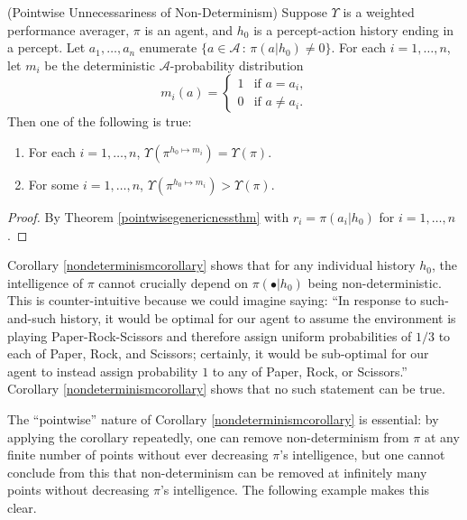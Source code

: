 \documentclass[runningheads]{llncs}
\begin{document}
\begin{corollary}
\label{nondeterminismcorollary}
    (Pointwise Unnecessariness of Non-Determinism)
    Suppose $\Upsilon$ is a weighted performance averager, $\pi$ is an agent,
    and $h_0$ is a percept-action history ending in a percept.
    Let $a_1,\ldots,a_n$ enumerate $\{a\in\mathcal A\,:\,\pi(a|h_0)\not=0\}$.
    For each $i=1,\ldots,n$, let $m_i$ be the
    deterministic $\mathcal A$-probability distribution
    \[
        m_i(a) = \begin{cases}
            1 &\mbox{if $a=a_i$,}\\
            0 &\mbox{if $a\not=a_i$.}
        \end{cases}
    \]
    Then one of the following is true:
    \begin{enumerate}
        \item
        For each $i=1,\ldots,n$, $\Upsilon(\pi^{h_0\mapsto m_i})=\Upsilon(\pi)$.
        \item
        For some $i=1,\ldots,n$, $\Upsilon(\pi^{h_0\mapsto m_i})>\Upsilon(\pi)$.
    \end{enumerate}
\end{corollary}

\begin{proof}
    By Theorem \ref{pointwisegenericnessthm} with
    $r_i=\pi(a_i|h_0)$ for $i=1,\ldots,n$.
\end{proof}

Corollary \ref{nondeterminismcorollary} shows that for any individual
history $h_0$, the intelligence of $\pi$ cannot crucially depend on $\pi(\bullet|h_0)$
being non-deterministic. This is counter-intuitive because we could imagine saying:
``In response to such-and-such history, it would be optimal for our agent
to assume the environment is playing Paper-Rock-Scissors and therefore
assign uniform probabilities of $1/3$ to each of Paper, Rock, and Scissors;
certainly, it would be sub-optimal for our agent to instead assign probability $1$ to
any of Paper, Rock, or Scissors.'' Corollary \ref{nondeterminismcorollary} shows
that no such statement can be true.

The ``pointwise'' nature of Corollary \ref{nondeterminismcorollary}
is essential: by applying the corollary repeatedly, one can remove non-determinism
from $\pi$ at any finite number of points without ever decreasing $\pi$'s intelligence,
but one cannot conclude from this that non-determinism can be removed at infinitely
many points without decreasing $\pi$'s intelligence. The following example makes this
clear.
\end{document}
